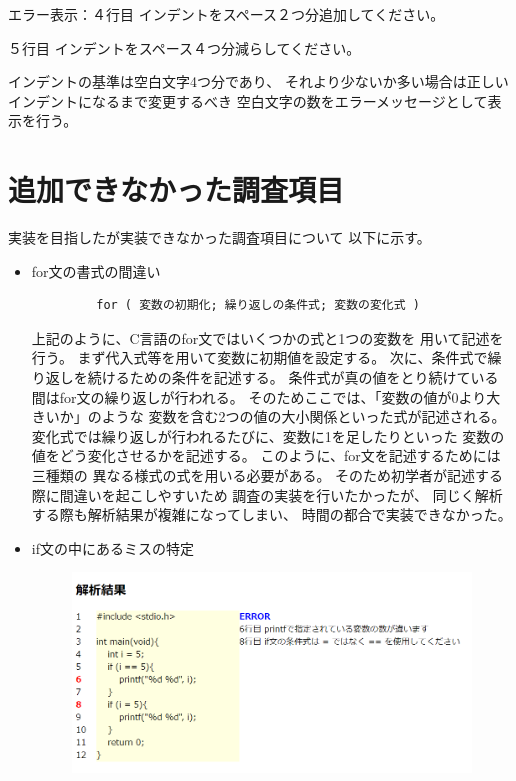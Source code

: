 \documentclass{csspaper}
\begin{document}
      エラー表示：４行目 インデントをスペース２つ分追加してください。

      ５行目 インデントをスペース４つ分減らしてください。

      インデントの基準は空白文字4つ分であり、
      それより少ないか多い場合は正しいインデントになるまで変更するべき
      空白文字の数をエラーメッセージとして表示を行う。

      \section{追加できなかった調査項目}
      実装を目指したが実装できなかった調査項目について
      以下に示す。
      \begin{itemize}
         \item for文の書式の間違い
         
         \begin{lstlisting}
         for ( 変数の初期化; 繰り返しの条件式; 変数の変化式 )
         \end{lstlisting}
         
         上記のように、C言語のfor文ではいくつかの式と1つの変数を
         用いて記述を行う。
         まず代入式等を用いて変数に初期値を設定する。
         次に、条件式で繰り返しを続けるための条件を記述する。
         条件式が真の値をとり続けている間はfor文の繰り返しが行われる。
         そのためここでは、「変数の値が0より大きいか」のような
         変数を含む2つの値の大小関係といった式が記述される。
         変化式では繰り返しが行われるたびに、変数に1を足したりといった
         変数の値をどう変化させるかを記述する。
         このように、for文を記述するためには三種類の
         異なる様式の式を用いる必要がある。
         そのため初学者が記述する際に間違いを起こしやすいため
         調査の実装を行いたかったが、
         同じく解析する際も解析結果が複雑になってしまい、
         時間の都合で実装できなかった。
         
         \item if文の中にあるミスの特定
         
         \begin{figure}[h]
            \centering
            \includegraphics[width=13cm]{sample7.png}
         \end{figure}
         

\end{itemize}
\end{document}
